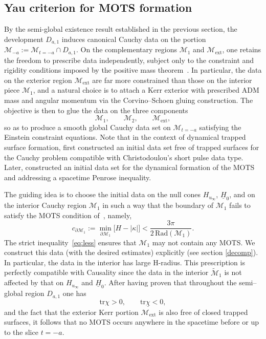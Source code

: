\documentclass{amsart}
\newcommand{\Hbar}{\underline{H}}
\newcommand{\chibar}{\underline{\chi}}
\newcommand{\tr}{\mbox{tr}}
\begin{document}
\noindent \subsection{Yau \cite{yau} criterion for MOTS formation}
\noindent By the semi-global existence result established in the previous section, 
the development $D_{a,1}$ induces canonical Cauchy data on the portion 
$\mathcal{M}_{-a} := \mathcal{M}_{t=-a} \cap D_{a,1}$.
On the complementary regions 
$\mathcal{M}_{1}$ and $\mathcal{M}_{\mathrm{ext}}$,
one retains the freedom to prescribe data independently, 
subject only to the constraint and rigidity conditions imposed by 
the positive mass theorem~\cite{schoenyau1,schoenyau2,schoenyau3}. 
In particular, the data on the exterior region $\mathcal{M}_{\mathrm{ext}}$ 
are far more constrained than those on the interior piece $\mathcal{M}_{1}$, 
and a natural choice is to attach a Kerr exterior with prescribed ADM mass and angular momentum 
via the Corvino--Schoen gluing construction. 
The objective is then to glue the data on the three components
\[
\mathcal{M}_{\mathrm{1}}, \qquad 
\mathcal{M}_{2}, \qquad 
\mathcal{M}_{\mathrm{ext}},
\]
so as to produce a smooth global Cauchy data set on $\mathcal{M}_{t=-a}$ 
satisfying the Einstein constraint equations. Note that in the context of dynamical trapped surface formation, \cite{Li} first constructed an initial data set free of trapped surfaces for the Cauchy problem compatible with Christodoulou's short pulse data type. Later, \cite{AL} constructed an initial data set for the dynamical formation of the MOTS and addressing a spacetime Penrose inequality.
\medskip

\noindent The guiding idea is to choose the initial data on the null cones 
$H_{u_\infty}$, $\Hbar_{0}$, and on the interior Cauchy region $\mathcal{M}_{1}$ 
in such a way that the boundary of $\mathcal{M}_{1}$ fails to satisfy 
the MOTS condition of~\cite{yau}, namely,
\begin{equation}\label{eq:less}
c_{\partial \mathcal{M}_{1}}
:=
\min_{\partial \mathcal{M}_{1}}
\big[H - |\kappa|\big]
<
\frac{3\pi}{2\,\mathrm{Rad}(\mathcal{M}_{1})}.
\end{equation}
The strict inequality~\eqref{eq:less} ensures that 
$\mathcal{M}_{1}$ may not contain any MOTS. We construct this data (with the desired estimates) explicitly (see section \ref{decomp}). In particular, the data in the interior has large H-radius. This prescription is perfectly compatible with Causality since the data in the interior $\widetilde{\mathcal{M}}_{1}$ is not affected by that on $H_{u_{\infty}}$ and $\Hbar_{0}$.
After having proven that throughout the semi--global region $D_{a,1}$ one has 
\[
\tr\chi > 0, \qquad \tr\chibar < 0,
\]
and the fact that the exterior Kerr portion $\mathcal{M}_{\mathrm{ext}}$ 
is also free of closed trapped surfaces, 
it follows that no MOTS occurs anywhere in the spacetime 
before or up to the slice $t=-a$. 
\end{document}
